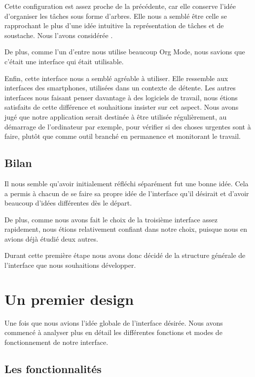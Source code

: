 \documentclass[11pt]{article}
\begin{document}
Cette configuration est assez proche de la précédente, car elle
conserve l'idée d'organiser les tâches sous forme d'arbres. Elle nous
a semblé être celle se rapprochant le plus d'une idée intuitive la
représentation de tâches et de \gls{soustache}. Nous l'avons
considérée .

De plus, comme l'un d'entre nous utilise beaucoup Org Mode, nous
savions que c'était une interface qui était utilisable.

Enfin, cette interface nous a semblé agréable à utiliser. Elle
ressemble aux interfaces des smartphones, utilisées dans un contexte
de détente. Les autres interfaces nous faisant penser davantage à des
logiciels de travail, nous étions satisfaits de cette différence et
souhaitions insister sur cet aspect. Nous avons jugé que notre
application serait destinée à être utilisée régulièrement, au
démarrage de l'ordinateur par exemple, pour vérifier si des choses
urgentes sont à faire, plutôt que comme outil branché en permanence et
monitorant le travail.


\subsection{Bilan}

Il nous semble qu'avoir initialement réfléchi séparément fut une bonne
idée. Cela a permis à chacun de se faire sa propre idée de l'interface
qu'il désirait et d'avoir beaucoup d'idées différentes dès le départ.

De plus, comme nous avons fait le choix de la troisième interface assez
rapidement, nous étions relativement confiant dans notre choix,
puisque nous en avions déjà étudié deux autres.

Durant cette première étape nous avons donc décidé de la structure
générale de l'interface que nous souhaitions développer.


\section{Un premier design}
\label{sec:premierDesign}

Une fois que nous avions l'idée globale de l'interface désirée. Nous
avons commencé à analyser plus en détail les différentes fonctions et
modes de fonctionnement de notre interface.


\subsection{Les fonctionnalités}
\end{document}
